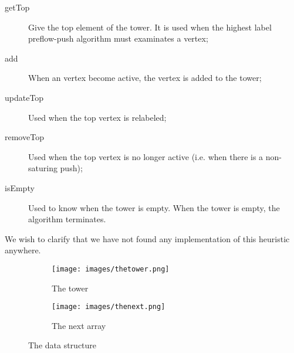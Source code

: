 \begin{description}
	\item[getTop] Give the top element of the tower. It is used when the highest label preflow-push algorithm must examinates a vertex;
	\item[add] When an vertex become active, the vertex is added to the tower;
	\item[updateTop] Used when the top vertex is relabeled;
	\item[removeTop] Used when the top vertex is no longer active (i.e. when there is a non-saturing push);
	\item[isEmpty] Used to know when the tower is empty. When the tower is empty, the algorithm terminates.
\end{description}

We wish to clarify that we have not found any implementation of this heuristic anywhere.

\begin{figure}
\centering
\begin{subfigure}{.5\textwidth}
  \centering
  \texttt{[image: images/thetower.png]}
  \caption{The tower}
  \label{fig:tower}
\end{subfigure}%
\begin{subfigure}{.5\textwidth}
  \centering
  \texttt{[image: images/thenext.png]}
  \caption{The next array}
  \label{fig:next}
\end{subfigure}
\caption{The data structure}
\label{fig:TheTower}
\end{figure}


